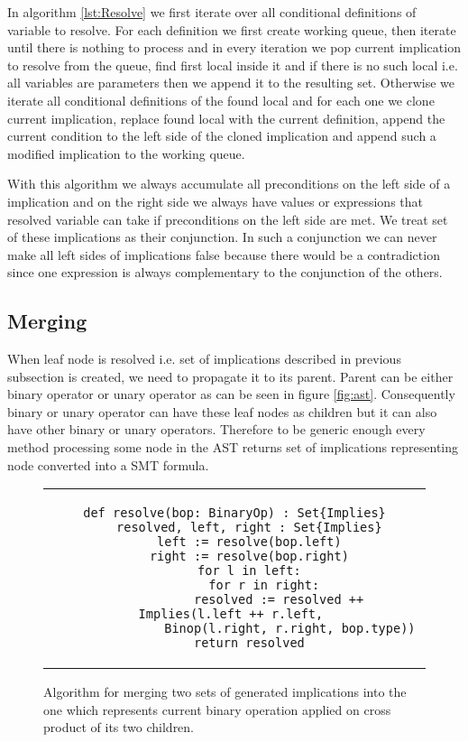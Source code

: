 \documentclass[letterpaper,12pt]{article}
\begin{document}
In algorithm \ref{lst:Resolve} we first iterate over all conditional definitions of variable to resolve. For each definition we first create working queue, then iterate until there is nothing to process and in every iteration we pop current implication to resolve from the queue, find first local inside it and if there is no such local i.e. all variables are parameters then we append it to the resulting set. Otherwise we iterate all conditional definitions of the found local and for each one we clone current implication, replace found local with the current definition, append the current condition to the left side of the cloned implication and append such a modified implication to the working queue.

With this algorithm we always accumulate all preconditions on the left side of a implication and on the right side we always have values or expressions that resolved variable can take if preconditions on the left side are met. We treat set of these implications as their conjunction. In such a conjunction we can never make all left sides of implications false because there would be a contradiction since one expression is always complementary to the conjunction of the others.

\subsection{Merging}
When leaf node is resolved i.e. set of implications described in previous subsection is created, we need to propagate it to its parent. Parent can be either binary operator or unary operator as can be seen in figure \ref{fig:ast}. Consequently binary or unary operator can have these leaf nodes as children but it can also have other binary or unary operators. Therefore to be generic enough every method processing some node in the AST returns set of implications representing node converted into a SMT formula. 

\begin{figure}[thp] %
\centering 
\caption{Algorithm for merging two sets of generated implications into the one which represents current binary operation applied on cross product of its two children.}
\label{lst:ResolveBin}
\begin{tabular}{c}
\begin{lstlisting}
def resolve(bop: BinaryOp) : Set{Implies}
    resolved, left, right : Set{Implies}
    left := resolve(bop.left)
    right := resolve(bop.right)
    for l in left:
        for r in right:
            resolved := resolved ++ Implies(l.left ++ r.left, 
               Binop(l.right, r.right, bop.type))
    return resolved
\end{lstlisting}
\end{tabular}
\end{figure}
\end{document}

